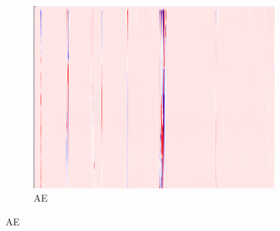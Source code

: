 \begin{figure}[!h]
\begin{subfigure}{0.33\textwidth}
        \includegraphics[width=\textwidth]{figures/test.png}
        \caption{AE}
    \end{subfigure}
    
    \vspace{1em}
    

\end{figure}
